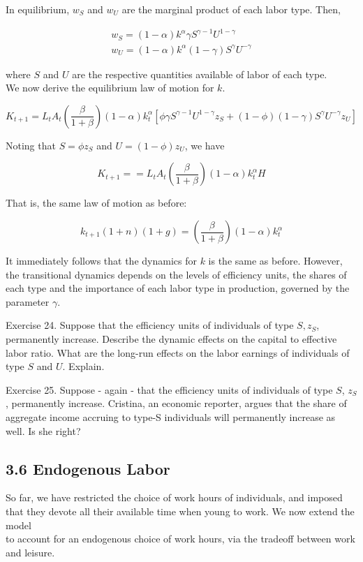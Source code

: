 \documentclass[10pt]{article}
\begin{document}
In equilibrium, $w_{S}$ and $w_{U}$ are the marginal product of each labor type. Then,

$$
\begin{gathered}
w_{S}=(1-\alpha) k^{\alpha} \gamma S^{\gamma-1} U^{1-\gamma} \\
w_{U}=(1-\alpha) k^{\alpha}(1-\gamma) S^{\gamma} U^{-\gamma}
\end{gathered}
$$

where $S$ and $U$ are the respective quantities available of labor of each type.\\
We now derive the equilibrium law of motion for $k$.

$$
K_{t+1}=L_{t} A_{t}\left(\frac{\beta}{1+\beta}\right)(1-\alpha) k_{t}^{\alpha}\left[\phi \gamma S^{\gamma-1} U^{1-\gamma} z_{S}+(1-\phi)(1-\gamma) S^{\gamma} U^{-\gamma} z_{U}\right]
$$

Noting that $S=\phi z_{S}$ and $U=(1-\phi) z_{U}$, we have

$$
K_{t+1}==L_{t} A_{t}\left(\frac{\beta}{1+\beta}\right)(1-\alpha) k_{t}^{\alpha} H
$$

That is, the same law of motion as before:

$$
k_{t+1}(1+n)(1+g)=\left(\frac{\beta}{1+\beta}\right)(1-\alpha) k_{t}^{\alpha}
$$

It immediately follows that the dynamics for $k$ is the same as before. However, the transitional dynamics depends on the levels of efficiency units, the shares of each type and the importance of each labor type in production, governed by the parameter $\gamma$.

Exercise 24. Suppose that the efficiency units of individuals of type $S, z_{S}$, permanently increase. Describe the dynamic effects on the capital to effective labor ratio. What are the long-run effects on the labor earnings of individuals of type $S$ and $U$. Explain.

Exercise 25. Suppose - again - that the efficiency units of individuals of type $S$, $z_{S}$, permanently increase. Cristina, an economic reporter, argues that the share of aggregate income accruing to type-S individuals will permanently increase as well. Is she right?

\subsection*{3.6 Endogenous Labor}
So far, we have restricted the choice of work hours of individuals, and imposed that they devote all their available time when young to work. We now extend the model\\
to account for an endogenous choice of work hours, via the tradeoff between work and leisure.
\end{document}
